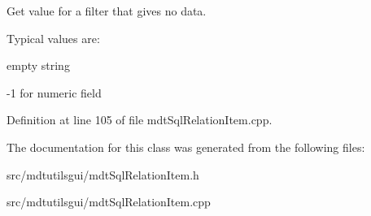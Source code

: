 Get value for a filter that gives no data. 

Typical values are:
\begin{DoxyItemize}
\item empty string
\item -\/1 for numeric field 
\end{DoxyItemize}

Definition at line 105 of file mdtSqlRelationItem.cpp.



The documentation for this class was generated from the following files:\begin{DoxyCompactItemize}
\item 
src/mdtutilsgui/mdtSqlRelationItem.h\item 
src/mdtutilsgui/mdtSqlRelationItem.cpp\end{DoxyCompactItemize}
